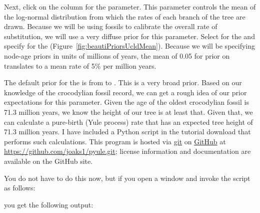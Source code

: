{    Next, click on the  column for the
     parameter.
    This parameter controls the mean of the log-normal distribution from which
    the rates of each branch of the tree are drawn.
    Because we will be using fossils to calibrate the overall rate of substitution,
    we will use a very diffuse prior for this parameter.
    Select  for the 
    and specify  for the 
    (Figure~\ref{fig:beautiPriorsUcldMean}).
    Because we will be specifying node-age priors in units of millions of
    years, the mean of 0.05 for prior on 
    translates to a mean rate of 5\% per million years.


    The default prior for the 
    is  from  to .
    This is a very broad prior.
    Based on our knowledge of the crocodylian fossil record, we can get
    a rough idea of our prior expectations for this parameter.
    Given the age of the oldest crocodylian fossil is 71.3 million
    years, we know the height of our tree is at least that.
    Given that, we can calculate a pure-birth (Yule process) rate that has an
    expected tree height of 71.3 million years.
    I have included a Python script  in the tutorial
    download that performs such calculations.
    This program is hosted via \href{http://git-scm.com/}{git} on
    \href{https://github.com/}{GitHub} at
    \href{https://github.com/joaks1/pyule.git}{\url{https://github.com/joaks1/pyule.git}};
    license information and documentation are available on the GitHub site.

    You do not have to do this now, but if you open a 
    window and invoke the script as follows:

    \hspace{1cm}

    you get the following output:

    \\
    \\
    \\

}
